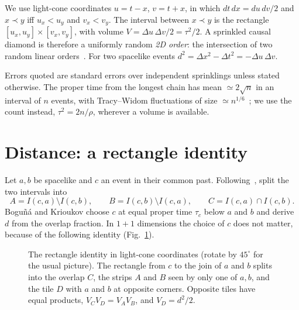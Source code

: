\documentclass[11pt,a4paper]{article}
\begin{document}
We use light-cone coordinates $u=t-x$, $v=t+x$, in which $dt\,dx=du\,dv/2$ and $x\prec y$ iff $u_x<u_y$ and $v_x<v_y$. The interval between $x\prec y$ is the rectangle $[u_x,u_y]\times[v_x,v_y]$, with volume $V=\Delta u\,\Delta v/2=\tau^2/2$. A sprinkled causal diamond is therefore a uniformly random \emph{2D order}: the intersection of two random linear orders~\cite{BHS08,Surya12}. For two spacelike events $d^2=\Delta x^2-\Delta t^2=-\Delta u\,\Delta v$.

Errors quoted are standard errors over independent sprinklings unless stated otherwise. The proper time from the longest chain has mean $\simeq2\sqrt n$ in an interval of $n$ events, with Tracy--Widom fluctuations of size $\simeq n^{1/6}$~\cite{BDJ99}; we use the count instead, $\tau^2=2n/\rho$, wherever a volume is available.

\section{Distance: a rectangle identity}\label{sec:dist}
Let $a,b$ be spacelike and $c$ an event in their common past. Following~\cite{BK24}, split the two intervals into
\begin{equation}
A=I(c,a)\setminus I(c,b),\qquad B=I(c,b)\setminus I(c,a),\qquad C=I(c,a)\cap I(c,b).
\end{equation}
Bogu\~n\'a and Krioukov choose $c$ at equal proper time $\tau_c$ below $a$ and $b$ and derive $d$ from the overlap fraction. In $1+1$ dimensions the choice of $c$ does not matter, because of the following identity (Fig.~\ref{fig:tiles}).

\begin{figure}[t]
\centering
{}
\caption{The rectangle identity in light-cone coordinates (rotate by $45^\circ$ for the usual picture). The rectangle from $c$ to the join of $a$ and $b$ splits into the overlap $C$, the strips $A$ and $B$ seen by only one of $a,b$, and the tile $D$ with $a$ and $b$ at opposite corners. Opposite tiles have equal products, $V_CV_D=V_AV_B$, and $V_D=d^2/2$.}
\label{fig:tiles}
\end{figure}
\end{document}
